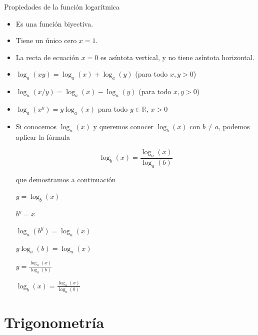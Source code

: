 \begin{property}

Propiedades de la función logarítmica

\begin{itemize}

\item Es una función biyectiva.

\item Tiene un único cero $x=1$.

\item La recta de ecuación $x=0$ es asíntota vertical, y no tiene asíntota horizontal.

\item $ \log_a(xy) = \log_a(x) + \log_a(y)$ (para todo $x,y > 0$)

\item $ \log_a(x/y) = \log_a(x) - \log_a(y)$ (para todo $x,y > 0$)

\item $ \log_a(x^y) = y \log_a(x)$ para todo $y \in \mathbb{R}$, $x > 0$

\item Si conocemos $\log_a(x)$ y queremos conocer $\log_b(x)$ con $b \neq a$, podemos aplicar la fórmula

$$ \log_b(x) = \frac{\log_a(x)}{\log_a(b)}$$

que demostramos a continuación

$ y = \log_b(x)$

$ b^y = x $

$ \log_a(b^y) = \log_a(x) $

$ y \log_a(b) = \log_a(x) $

$ y = \frac{\log_a(x)}{\log_a(b)} $

$ \log_b(x) = \frac{\log_a(x)}{\log_a(b)} $
\end{itemize}
\end{property}



\chapter{Trigonometría}

